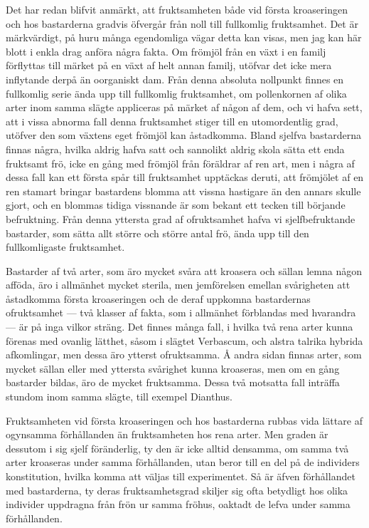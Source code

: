 Det har redan blifvit anmärkt, att fruktsamheten både vid första kroaseringen och hos bastarderna gradvis öfvergår från noll till fullkomlig fruktsamhet. Det är märkvärdigt, på huru många egendomliga vägar detta kan visas, men jag kan här blott i enkla drag anföra några fakta. Om frömjöl från en växt i en familj förflyttas till märket på en växt af helt annan familj, utöfvar det icke mera inflytande derpå än oorganiskt dam. Från denna absoluta nollpunkt finnes en fullkomlig serie ända upp till fullkomlig fruktsamhet, om pollenkornen af olika arter inom samma slägte appliceras på märket af någon af dem, och vi hafva sett, att i vissa abnorma fall denna fruktsamhet stiger till en utomordentlig grad, utöfver den som växtens eget frömjöl kan åstadkomma. Bland sjelfva bastarderna finnas några, hvilka aldrig hafva satt och sannolikt aldrig skola sätta ett enda fruktsamt frö, icke en gång med frömjöl från föräldrar af ren art, men i några af dessa fall kan ett första spår till fruktsamhet upptäckas deruti, att frömjölet af en ren stamart bringar bastardens blomma att vissna hastigare än den annars skulle gjort, och en blommas tidiga vissnande är som bekant ett tecken till börjande befruktning. Från denna yttersta grad af ofruktsamhet hafva vi sjelfbefruktande bastarder, som sätta allt större och större antal frö, ända upp till den fullkomligaste fruktsamhet.

Bastarder af två arter, som äro mycket svåra att kroasera och sällan lemna någon afföda, äro i allmänhet mycket sterila, men jemförelsen emellan svårigheten att åstadkomma första kroaseringen och de deraf uppkomna bastardernas ofruktsamhet — två klasser af fakta, som i allmänhet förblandas med hvarandra — är på inga vilkor sträng. Det finnes många fall, i hvilka två rena arter kunna förenas med ovanlig lätthet, såsom i slägtet Verbascum, och alstra talrika hybrida afkomlingar, men dessa äro ytterst ofruktsamma. Å andra sidan finnas arter, som mycket sällan eller med yttersta svårighet kunna kroaseras, men om en gång bastarder bildas, äro de mycket fruktsamma. Dessa två motsatta fall inträffa stundom inom samma slägte, till exempel Dianthus.

Fruktsamheten vid första kroaseringen och hos bastarderna rubbas vida lättare af ogynsamma förhållanden än fruktsamheten hos rena arter. Men graden är dessutom i sig sjelf föränderlig, ty den är icke alltid densamma, om samma två arter kroaseras under samma förhållanden, utan beror till en del på de individers konstitution, hvilka komma att väljas till experimentet. Så är äfven förhållandet med bastarderna, ty deras fruktsamhetsgrad skiljer sig ofta betydligt hos olika individer uppdragna från frön ur samma fröhus, oaktadt de lefva under samma förhållanden.

